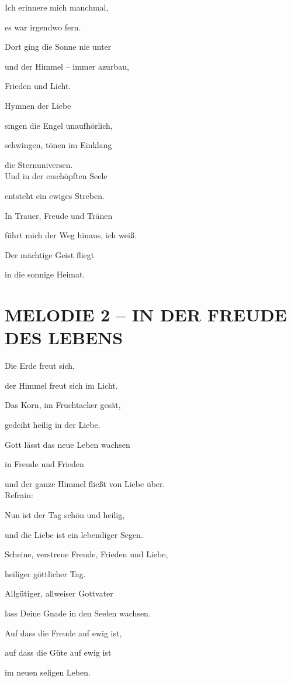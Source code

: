 \documentclass[11pt,a5paper,twoside]{article}
\begin{document}
Ich erinnere mich manchmal,

es war irgendwo fern.

Dort ging die Sonne nie unter 

und der Himmel -- immer azurbau,

Frieden und Licht.

Hymnen der Liebe

singen die Engel unaufhörlich,

schwingen, tönen im Einklang 

die Sternuniversen. \\


Und in der erschöpften Seele

entsteht ein ewiges Streben.

In Trauer, Freude und Tränen

führt mich der Weg hinaus, ich weiß.

Der mächtige Geist fliegt

in die sonnige Heimat.

\section[Melodie 2 -- In der Freude des Lebens]{MELODIE 2 -- IN DER FREUDE DES LEBENS}

Die Erde freut sich,

der Himmel freut sich im Licht.

Das Korn, im Fruchtacker gesät,

gedeiht heilig in der Liebe. 

Gott lässt das neue Leben wachsen

in Freude und Frieden

und der ganze Himmel fließt von Liebe über.\\

Refrain:

Nun ist der Tag schön und heilig,

und die Liebe ist ein lebendiger Segen.

Scheine, verstreue Freude, Frieden und Liebe,

heiliger göttlicher Tag. 

Allgütiger, allweiser Gottvater

lass Deine Gnade in den Seelen wachsen.

Auf dass die Freude auf ewig ist,

auf dass die Güte auf ewig ist

im neuen seligen Leben.
\end{document}
